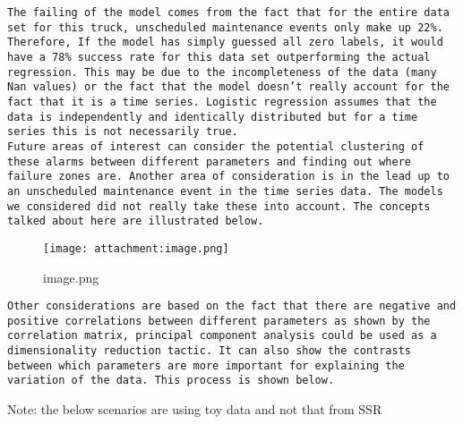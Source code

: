 \documentclass[11pt]{article}
\makeatletter
\def\maxwidth{\ifdim\Gin@nat@width>\linewidth\linewidth
    \else\Gin@nat@width\fi}
\let\Oldincludegraphics\includegraphics
\renewcommand{\includegraphics}[1]{\Oldincludegraphics[width=.8\maxwidth]{#1}}
\makeatother
\begin{document}
\begin{verbatim}
The failing of the model comes from the fact that for the entire data set for this truck, unscheduled maintenance events only make up 22%. Therefore, If the model has simply guessed all zero labels, it would have a 78% success rate for this data set outperforming the actual regression. This may be due to the incompleteness of the data (many Nan values) or the fact that the model doesn’t really account for the fact that it is a time series. Logistic regression assumes that the data is independently and identically distributed but for a time series this is not necessarily true.
Future areas of interest can consider the potential clustering of these alarms between different parameters and finding out where failure zones are. Another area of consideration is in the lead up to an unscheduled maintenance event in the time series data. The models we considered did not really take these into account. The concepts talked about here are illustrated below.
\end{verbatim}

    \begin{figure}
\centering
\texttt{[image: attachment:image.png]}
\caption{image.png}
\end{figure}

    \begin{verbatim}
Other considerations are based on the fact that there are negative and positive correlations between different parameters as shown by the correlation matrix, principal component analysis could be used as a dimensionality reduction tactic. It can also show the contrasts between which parameters are more important for explaining the variation of the data. This process is shown below.
\end{verbatim}

    Note: the below scenarios are using toy data and not that from SSR
\end{document}
